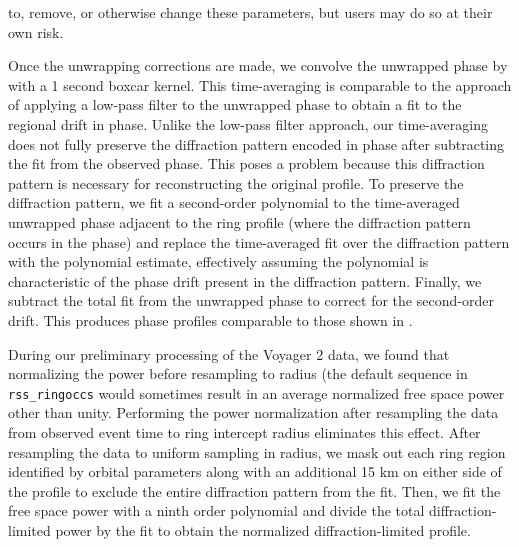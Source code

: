 \documentclass[titlepage, 12pt]{article}
\begin{document}
           to, remove, or otherwise change these parameters, but users may do so at their own risk. 
           \par\hfill\par
           Once the unwrapping corrections are made, we convolve the unwrapped phase by 
           with a 1 second boxcar kernel. This time-averaging is comparable to the \citet{Gresh1989}
           approach of applying a low-pass filter to the unwrapped phase to obtain a fit to the regional drift in phase. Unlike
           the low-pass filter approach, our time-averaging does not fully preserve the diffraction
           pattern encoded in phase after subtracting the fit from the observed phase. This poses a
           problem because this diffraction pattern is necessary for reconstructing the original profile. To
           preserve the diffraction pattern, we fit a second-order polynomial to the time-averaged
           unwrapped phase adjacent to the ring profile (where the diffraction pattern occurs in the
           phase) and replace the time-averaged fit over the diffraction pattern with the polynomial 
           estimate, effectively assuming the polynomial is characteristic of the phase drift present in 
           the diffraction pattern. Finally, we subtract the total fit from the unwrapped phase to correct
           for the second-order drift. This produces phase profiles comparable to those shown in \citet{Gresh1989}.
           \par\hfill\par
           During our preliminary processing of the Voyager 2 data, we found that normalizing the power
           before resampling to radius (the default sequence in \texttt{rss\_ringoccs} would sometimes result in an
           average normalized free space power other than unity. Performing the power normalization
           after resampling the data from observed event time to ring intercept radius eliminates this
           effect. After resampling the data to uniform sampling in radius, we mask out each ring region
           identified by orbital parameters along with an additional 15 km on either side of the profile
           to exclude the entire diffraction pattern from the fit. Then, we fit the free space power with
           a ninth order polynomial and divide the total diffraction-limited power by the fit to obtain
           the normalized diffraction-limited profile.
\end{document}
